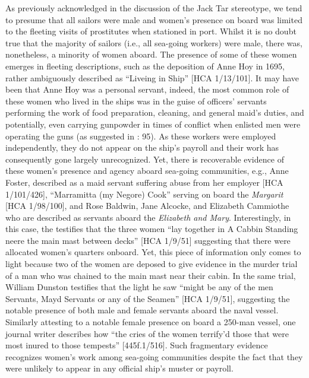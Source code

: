  As previously acknowledged in the discussion of the Jack Tar stereotype, we tend to presume that all sailors were male and women’s presence on board was limited to the fleeting visits of prostitutes when stationed in port. Whilst it is no doubt true that the majority of sailors (i.e., all sea-going workers) were male, there was, nonetheless, a minority of women aboard. The presence of some of these women emerges in fleeting descriptions, such as the deposition of Anne Hoy in 1695, rather ambiguously described as “Liveing in Ship” [HCA 1/13/101].  It may have been that Anne Hoy was a personal servant, indeed, the most common role of these women who lived in the ships was in the guise of officers’ servants performing the work of food preparation, cleaning, and general maid’s duties, and potentially, even carrying gunpowder in times of conflict when enlisted men were operating the guns (as suggested in \citealt{Brown2011}: 95). As these workers were employed independently, they do not appear on the ship’s payroll and their work has consequently gone largely unrecognized. Yet, there is recoverable evidence of these women’s presence and agency aboard sea-going communities, e.g., Anne Foster, described as a maid servant suffering abuse from her employer [HCA 1/101/426], “Marramitta (my Negore) Cook” serving on board the \textit{Margarit} [HCA 1/98/100], and Rose Baldwin, Jane Alcocke, and Elizabeth Cammiothe who are described as servants aboard the \textit{Elizabeth and Mary}. Interestingly, in this case, the  testifies that the three women “lay together in A Cabbin Standing neere the main mast between decks” [HCA 1/9/51] suggesting that there were allocated women’s quarters onboard. Yet, this piece of information only comes to light because two of the women are deposed to give evidence in the murder trial of a man who was chained to the main mast near their cabin. In the same trial, William Dunston testifies that the light he saw “might be any of the men Servants, Mayd Servants or any of the Seamen” [HCA 1/9/51], suggesting the notable presence of both male and female servants aboard the naval vessel. Similarly attesting to a notable female presence on board a 250-man vessel, one journal writer describes how “the cries of the women terrify’d those that were most inured to those tempests” [445f.1/516]. Such fragmentary evidence recognizes women’s work among sea-going communities despite the fact that they were unlikely to appear in any official ship’s muster or payroll. 

